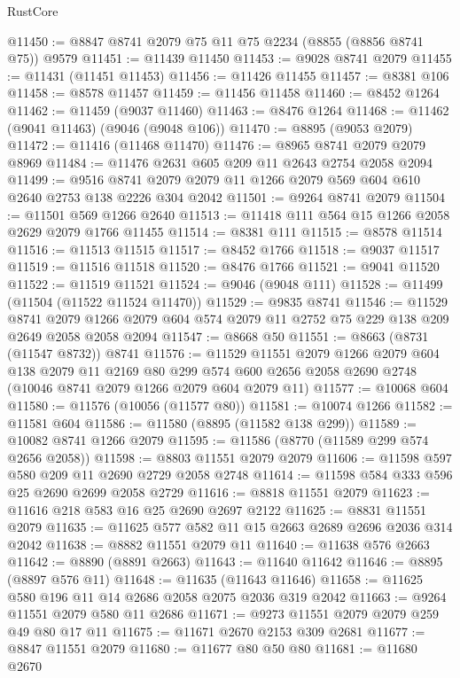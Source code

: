 \begin{lexlean}{RustCore}
\begin{coremodule}
@11450 := @8847 @8741 @2079 @75 @11 @75 @2234 (@8855 (@8856 @8741 @75)) @9579
@11451 := @11439 @11450
@11453 := @9028 @8741 @2079
@11455 := @11431 (@11451 @11453)
@11456 := @11426 @11455
@11457 := @8381 @106
@11458 := @8578 @11457
@11459 := @11456 @11458
@11460 := @8452 @1264
@11462 := @11459 (@9037 @11460)
@11463 := @8476 @1264
@11468 := @11462 (@9041 @11463) (@9046 (@9048 @106))
@11470 := @8895 (@9053 @2079)
@11472 := @11416 (@11468 @11470)
@11476 := @8965 @8741 @2079 @2079 @8969
@11484 := @11476 @2631 @605 @209 @11 @2643 @2754 @2058 @2094
@11499 := @9516 @8741 @2079 @2079 @11 @1266 @2079 @569 @604 @610 @2640 @2753 @138 @2226 @304 @2042
@11501 := @9264 @8741 @2079
@11504 := @11501 @569 @1266 @2640
@11513 := @11418 @111 @564 @15 @1266 @2058 @2629 @2079 @1766 @11455
@11514 := @8381 @111
@11515 := @8578 @11514
@11516 := @11513 @11515
@11517 := @8452 @1766
@11518 := @9037 @11517
@11519 := @11516 @11518
@11520 := @8476 @1766
@11521 := @9041 @11520
@11522 := @11519 @11521
@11524 := @9046 (@9048 @111)
@11528 := @11499 (@11504 (@11522 @11524 @11470))
@11529 := @9835 @8741
@11546 := @11529
    @8741
    @2079
    @1266
    @2079
    @604
    @574
    @2079
    @11
    @2752
    @75
    @229
    @138
    @209
    @2649
    @2058
    @2058
    @2094
@11547 := @8668 @50
@11551 := @8663 (@8731 (@11547 @8732)) @8741
@11576 := @11529
    @11551
    @2079
    @1266
    @2079
    @604
    @138
    @2079
    @11
    @2169
    @80
    @299
    @574
    @600
    @2656
    @2058
    @2690
    @2748
    (@10046 @8741 @2079 @1266 @2079 @604 @2079 @11)
@11577 := @10068 @604
@11580 := @11576 (@10056 (@11577 @80))
@11581 := @10074 @1266
@11582 := @11581 @604
@11586 := @11580 (@8895 (@11582 @138 @299))
@11589 := @10082 @8741 @1266 @2079
@11595 := @11586 (@8770 (@11589 @299 @574 @2656 @2058))
@11598 := @8803 @11551 @2079 @2079
@11606 := @11598 @597 @580 @209 @11 @2690 @2729 @2058 @2748
@11614 := @11598 @584 @333 @596 @25 @2690 @2699 @2058 @2729
@11616 := @8818 @11551 @2079
@11623 := @11616 @218 @583 @16 @25 @2690 @2697 @2122
@11625 := @8831 @11551 @2079
@11635 := @11625 @577 @582 @11 @15 @2663 @2689 @2696 @2036 @314 @2042
@11638 := @8882 @11551 @2079 @11
@11640 := @11638 @576 @2663
@11642 := @8890 (@8891 @2663)
@11643 := @11640 @11642
@11646 := @8895 (@8897 @576 @11)
@11648 := @11635 (@11643 @11646)
@11658 := @11625 @580 @196 @11 @14 @2686 @2058 @2075 @2036 @319 @2042
@11663 := @9264 @11551 @2079 @580 @11 @2686
@11671 := @9273 @11551 @2079 @2079 @259 @49 @80 @17 @11
@11675 := @11671 @2670 @2153 @309 @2681
@11677 := @8847 @11551 @2079
@11680 := @11677 @80 @50 @80
@11681 := @11680 @2670

\end{coremodule}
\end{lexlean}
